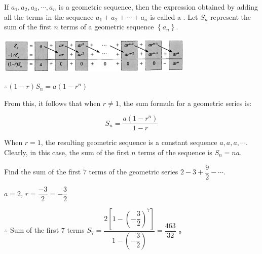 \documentclass{report}
\begin{document}
        If $a_{1}, a_{2}, a_{3}, \cdots, a_{n}$ is a geometric sequence, then the expression obtained by adding all the terms in the sequence $a_{1}+a_{2}+\cdots+a_{n}$ is called a . Let $S_{n}$ represent the sum of the first $n$ terms of a geometric sequence $\left\{a_{n}\right\}$.
        \begin{center}
            \includegraphics[width=0.7\textwidth]{assets/13-7.jpg}
        \end{center}
        $\therefore(1-r) S_{n}=a\left(1-r^{n}\right)$
        
        From this, it follows that when $r \neq 1$, the sum formula for a geometric series is:
        \begin{info}
            $$
            S_{n}=\dfrac{a(1-r^{n})}{1-r}
            $$
        \end{info}
        
        When $r=1$, the resulting geometric sequence is a constant sequence $a, a, a, \cdots$. Clearly, in this case, the sum of the first $n$ terms of the sequence is $S_{n}=n a$.
        
        \begin{question}
            Find the sum of the first $7$ terms of the geometric series $2-3+\dfrac{9}{2}-\cdots$.

            \sol{}

            \noindent $a = 2$, $r = \dfrac{-3}{2} = -\dfrac{3}{2}$

            \vspace{-1em}
            \noindent $\therefore$ Sum of the first $7$ terms $S_{7}=\dfrac{2\left[1-\left(-\dfrac{3}{2}\right)^{7}\right]}{1-\left(-\dfrac{3}{2}\right)}=\dfrac{463}{32}$ 。
        \end{question}
\end{document}
